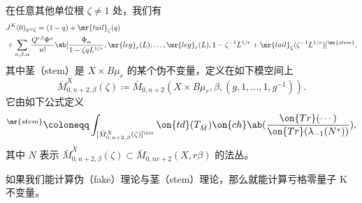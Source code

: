 \begin{prop}
    在任意其他单位根 \(\zeta \neq 1\) 处，我们有
    \begin{align*}
        &J^K(0)_{q = \zeta} = (1-q) + \mr{tail}_{\zeta}(q) \\
        &+ \sum_{n,\beta,\alpha} \frac{Q^{r\beta}\Phi^{\alpha}}{n!} \ab[\frac{\Phi_{\alpha}}{1-\zeta q L^{1/r}}, \mr{leg}_r(L), \ldots, \mr{leg}_r(L), 1 - \zeta^{-1}L^{1/r} + \mr{tail}_{\zeta}(\zeta^{-1} L^{1/r})]^{\mr{stem}},
    \end{align*}
    其中茎（stem）是 \(X \times B\mu_r\) 的某个伪不变量，定义在如下模空间上
    \[ \bar{M}_{0,n+2,\beta}^X(\zeta) \coloneqq \bar{M}_{0,n+2}(X \times B\mu_r, \beta, (g, 1, \ldots, 1, g^{-1})). \]
    它由如下公式定义
    \begin{align*}
        [\cdots]^{\mr{stem}} \coloneqq \int_{[\bar{M}_{0,n+2,\beta}^X(\zeta)]^{\vir}} \on{td}(T_{\bar{M}}) \on{ch}\ab(\frac{\on{Tr}(\cdots)}{\on{Tr}(\lambda_{-1}(N^*))}), 
    \end{align*}
    其中 \(N\) 表示 \(\bar{M}_{0,n+2,\beta}^X(\zeta) \subset \bar{M}_{0,nr+2}(X, r\beta)\) 的法丛。
\end{prop}

\begin{rmk}
    如果我们能计算伪（fake）理论与茎（stem）理论，那么就能计算亏格零量子 K 不变量。
\end{rmk}

